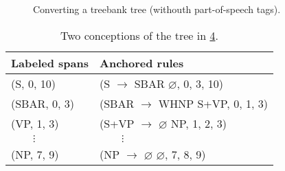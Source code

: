 \begin{figure}

  \begin{subfigure}[b]{\textwidth}
    \center
    \begin{tikzpicture}[scale=.6]
      
    \end{tikzpicture}
		\label{fig:tree-original}
  \end{subfigure}

  \begin{subfigure}[b]{\textwidth}
    \center
    \begin{tikzpicture}[scale=.6]
		  
    \end{tikzpicture}
    \tiny
		\label{fig:tree-simplified}
  \end{subfigure}

  \begin{subfigure}[b]{\textwidth}
    \center
    \begin{tikzpicture}[scale=.6]
		  
    \end{tikzpicture}
    \tiny
		\label{fig:tree-cnf}
  \end{subfigure}

  \begin{subfigure}[b]{\textwidth}
    \center
    \begin{tikzpicture}[scale=.6]
		  
    \end{tikzpicture}
    \tiny
		\label{fig:tree-cnf-spans}
  \end{subfigure}

\caption{Converting a treebank tree (withouth part-of-speech tags).}
\label{fig:trees-ptb}
\end{figure}


\begin{table}[h]
  \center
  \small
  \bgroup  %
  \def\arraystretch{1.5}  %
  \begin{tabular}{l|l}
    Labeled spans & Anchored rules \\
    \hline
    (S, 0, 10)     & (S $\to$ SBAR $\varnothing$, 0, 3, 10)  \\
    (SBAR, 0, 3)   & (SBAR $\to$ WHNP S+VP, 0, 1, 3)  \\
    (VP, 1, 3)     & (S+VP $\to$ $\varnothing$ NP, 1, 2, 3)  \\
    $\qquad\vdots$ & $\qquad\vdots$  \\
    (NP, 7, 9)     & (NP $\to$ $\varnothing$ $\varnothing$, 7, 8, 9)  \\
  \end{tabular}
  \caption{Two conceptions of the tree in \ref{fig:tree-cnf-spans}.}
  \label{tab:spans-rules}
  \egroup  %
\end{table}


